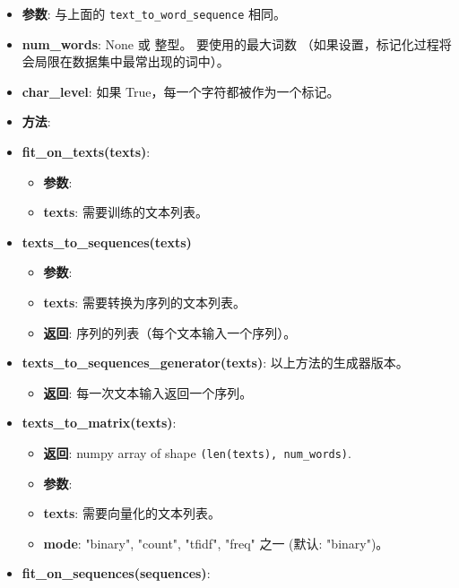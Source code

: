 \begin{itemize}
\item
  \textbf{参数}: 与上面的 \texttt{text\_to\_word\_sequence} 相同。
\item
  \textbf{num\_words}: None 或 整型。 要使用的最大词数
  （如果设置，标记化过程将会局限在数据集中最常出现的词中）。
\item
  \textbf{char\_level}: 如果 True，每一个字符都被作为一个标记。
\item
  \textbf{方法}:
\item
  \textbf{fit\_on\_texts(texts)}:

  \begin{itemize}
  \tightlist
  \item
    \textbf{参数}:
  \item
    \textbf{texts}: 需要训练的文本列表。
  \end{itemize}
\item
  \textbf{texts\_to\_sequences(texts)}

  \begin{itemize}
  \tightlist
  \item
    \textbf{参数}:
  \item
    \textbf{texts}: 需要转换为序列的文本列表。
  \item
    \textbf{返回}: 序列的列表（每个文本输入一个序列）。
  \end{itemize}
\item
  \textbf{texts\_to\_sequences\_generator(texts)}:
  以上方法的生成器版本。

  \begin{itemize}
  \tightlist
  \item
    \textbf{返回}: 每一次文本输入返回一个序列。
  \end{itemize}
\item
  \textbf{texts\_to\_matrix(texts)}:

  \begin{itemize}
  \tightlist
  \item
    \textbf{返回}: numpy array of shape
    \texttt{(len(texts),\ num\_words)}.
  \item
    \textbf{参数}:
  \item
    \textbf{texts}: 需要向量化的文本列表。
  \item
    \textbf{mode}: "binary", "count", "tfidf", "freq" 之一 (默认:
    "binary")。
  \end{itemize}
\item
  \textbf{fit\_on\_sequences(sequences)}:


\end{itemize}

